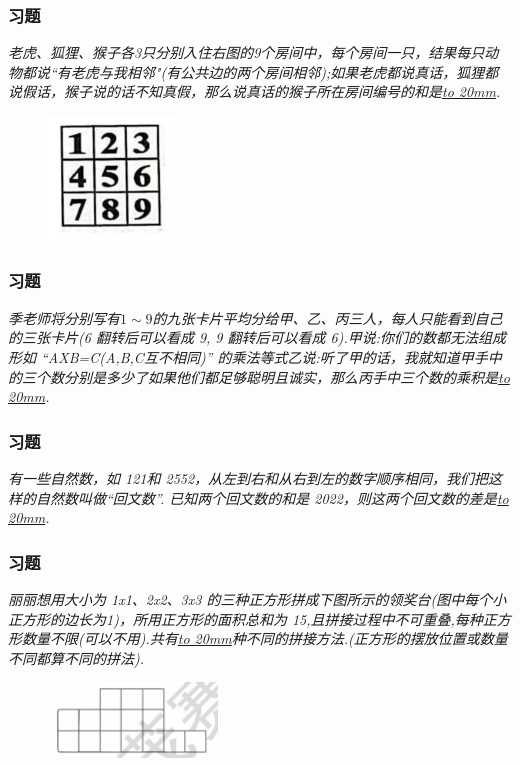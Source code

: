 \begin{frame}
    \frametitle{习题\theframecounter}
    \textit{老虎、狐狸、猴子各3只分别入住右图的9个房间中，每个房间一只，结果每只动物都说“有老虎与我相邻"(有公共边的两个房间相邻);如果老虎都说真话，狐狸都说假话，猴子说的话不知真假，那么说真话的猴子所在房间编号的和是\underline{\hbox to 20mm{}}.}
    \begin{figure}[H] 
        \centering
        \includegraphics[width=0.3\textwidth]{./pics/Chapter_7/4.png}
    \end{figure}
\end{frame}

\begin{frame}
    \frametitle{习题\theframecounter}
    \vspace*{-3cm}
    \textit{季老师将分别写有$1\sim 9$的九张卡片平均分给甲、乙、丙三人，每人只能看到自己的三张卡片(6 翻转后可以看成 9, 9 翻转后可以看成 6).甲说:你们的数都无法组成形如 ``AXB=C(A,B,C互不相同)'' 的乘法等式乙说:听了甲的话，我就知道甲手中的三个数分别是多少了如果他们都足够聪明且诚实，那么丙手中三个数的乘积是\underline{\hbox to 20mm{}}.}
\end{frame}

\begin{frame}
    \frametitle{习题\theframecounter}
    \vspace*{-3cm}
    \textit{有一些自然数，如 121和 2552，从左到右和从右到左的数字顺序相同，我们把这样的自然数叫做“回文数”. 已知两个回文数的和是 2022，则这两个回文数的差是\underline{\hbox to 20mm{}}.}
\end{frame}


\begin{frame}
    \frametitle{习题\theframecounter}
    \textit{丽丽想用大小为 1x1、2x2、3x3 的三种正方形拼成下图所示的领奖台(图中每个小正方形的边长为1)，所用正方形的面积总和为 15,且拼接过程中不可重叠,每种正方形数量不限(可以不用).共有\underline{\hbox to 20mm{}}种不同的拼接方法.(正方形的摆放位置或数量不同都算不同的拼法).}
    \begin{figure}[H] 
        \centering
        \includegraphics[width=0.4\textwidth]{./pics/Chapter_7/7.png}
    \end{figure}
\end{frame}

